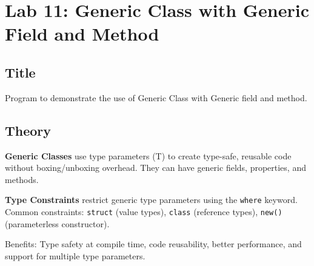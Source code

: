 \documentclass[10pt,a4paper]{article}
\begin{document}
\newpage

\section*{Lab 11: Generic Class with Generic Field and Method}

\subsection*{Title}
Program to demonstrate the use of Generic Class with Generic field and method.

\subsection*{Theory}
\textbf{Generic Classes} use type parameters (T) to create type-safe, reusable code without boxing/unboxing overhead. They can have generic fields, properties, and methods.

\textbf{Type Constraints} restrict generic type parameters using the \texttt{where} keyword. Common constraints: \texttt{struct} (value types), \texttt{class} (reference types), \texttt{new()} (parameterless constructor).

Benefits: Type safety at compile time, code reusability, better performance, and support for multiple type parameters.
\end{document}
